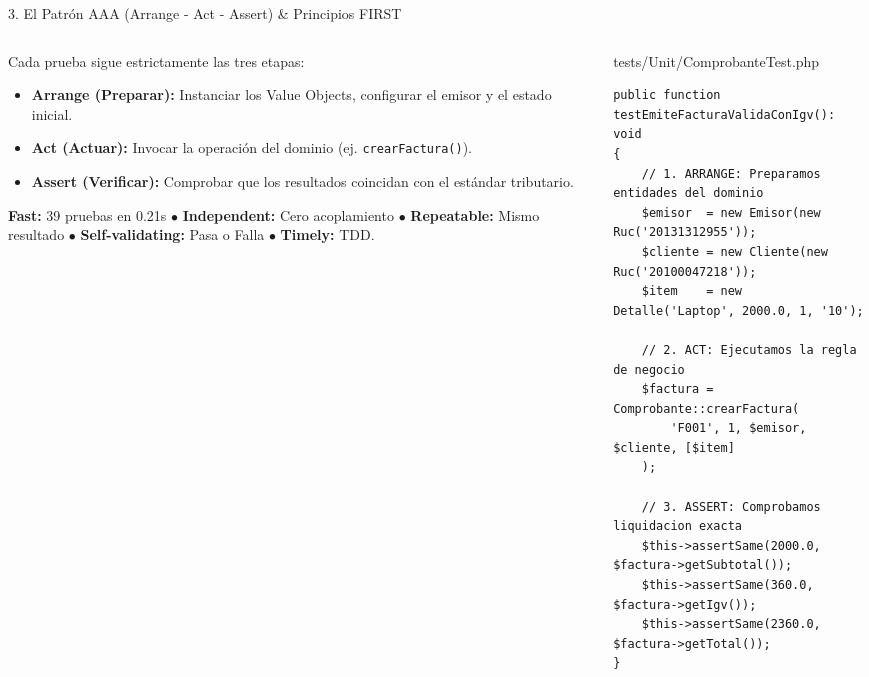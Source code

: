 \documentclass[aspectratio=169,10pt]{beamer}
\begin{document}
\begin{frame}[fragile]{3. El Patrón AAA (Arrange - Act - Assert) \& Principios FIRST}
\begin{columns}
\begin{column}{0.48\textwidth}
    \begin{tcolorbox}[colback=cardbg, colframe=cardbg, title=\color{accentblue}\bfseries Estructura Canónica AAA]
        Cada prueba sigue estrictamente las tres etapas:
        \begin{itemize}
            \item \textbf{Arrange (Preparar):} Instanciar los Value Objects, configurar el emisor y el estado inicial.
            \item \textbf{Act (Actuar):} Invocar la operación del dominio (ej. \texttt{crearFactura()}).
            \item \textbf{Assert (Verificar):} Comprobar que los resultados coincidan con el estándar tributario.
        \end{itemize}
    \end{tcolorbox}
    \vspace{0.1cm}
    \begin{tcolorbox}[colback=cardbg, colframe=cardbg, title=\color{accentgreen}\bfseries Principios FIRST de Robert C. Martin]
        \textbf{Fast:} 39 pruebas en 0.21s $\bullet$ \textbf{Independent:} Cero acoplamiento $\bullet$ \textbf{Repeatable:} Mismo resultado $\bullet$ \textbf{Self-validating:} Pasa o Falla $\bullet$ \textbf{Timely:} TDD.
    \end{tcolorbox}
\end{column}
\begin{column}{0.52\textwidth}
    \begin{codebox}{tests/Unit/ComprobanteTest.php}
\begin{lstlisting}
public function testEmiteFacturaValidaConIgv(): void 
{
    // 1. ARRANGE: Preparamos entidades del dominio
    $emisor  = new Emisor(new Ruc('20131312955'));
    $cliente = new Cliente(new Ruc('20100047218'));
    $item    = new Detalle('Laptop', 2000.0, 1, '10');

    // 2. ACT: Ejecutamos la regla de negocio
    $factura = Comprobante::crearFactura(
        'F001', 1, $emisor, $cliente, [$item]
    );

    // 3. ASSERT: Comprobamos liquidacion exacta
    $this->assertSame(2000.0, $factura->getSubtotal());
    $this->assertSame(360.0,  $factura->getIgv());
    $this->assertSame(2360.0, $factura->getTotal());
}
\end{lstlisting}
    \end{codebox}
\end{column}
\end{columns}
\end{frame}
\end{document}
